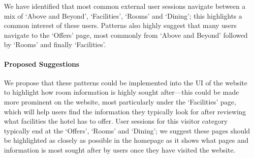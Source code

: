 We have identified that most common external user sessions navigate between a mix of `Above and Beyond', `Facilities', `Rooms' and `Dining'; this highlights a common interest of these users. Patterns also highly suggest that many users navigate to the `Offers' page, most commonly from `Above and Beyond' followed by `Rooms' and finally `Facilities'.

\paragraph{Proposed Suggestions} We propose that these patterns could be implemented into the UI of the website to highlight how room information is highly sought after---this could be made more prominent on the website, most particularly under the `Facilities' page, which will help users find the information they typically look for after reviewing what facilities the hotel has to offer. User sessions for this visitor category typically end at the `Offers', `Rooms' and `Dining'; we suggest these pages should be highlighted as closely as possible in the homepage as it shows what pages and information is most sought after by users once they have visited the website.

